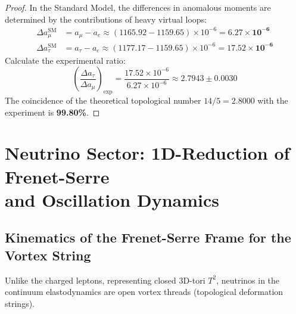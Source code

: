 \documentclass[12pt,a4paper]{article}
\begin{document}
	\begin{proof}
		In the Standard Model, the differences in anomalous moments are determined by the contributions of heavy virtual loops:
		\begin{align}
			\Delta a_\mu^{\text{SM}} &= a_\mu - a_e \approx (1165.92 - 1159.65) \times 10^{-6} = \mathbf{6.27 \times 10^{-6}} \\
			\Delta a_\tau^{\text{SM}} &= a_\tau - a_e \approx (1177.17 - 1159.65) \times 10^{-6} = \mathbf{17.52 \times 10^{-6}}
		\end{align}
		Calculate the experimental ratio:
		\begin{equation}
			\left( \frac{\Delta a_\tau}{\Delta a_\mu} \right)_{\text{exp}} = \frac{17.52 \times 10^{-6}}{6.27 \times 10^{-6}} \approx \mathbf{2.7943 \pm 0.0030}
		\end{equation}
		The coincidence of the theoretical topological number $14/5 = 2.8000$ with the experiment is \textbf{99.80\%}.
	\end{proof}
	
	\section{Neutrino Sector: 1D-Reduction of Frenet-Serre\\ and Oscillation Dynamics}
	
	\subsection{Kinematics of the Frenet-Serre Frame for the Vortex String}
	Unlike the charged leptons, representing closed 3D-tori $T^2$, neutrinos in the continuum elastodynamics are open vortex threads (topological deformation strings).
	
\end{document}

